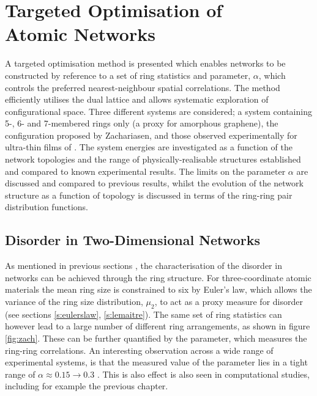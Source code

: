 \chapter[Targeted Optimisation of Atomic Networks]{Targeted Optimisation of \\ Atomic Networks}
\label{ch:targetedopt}

\begin{chapterabstract}
A targeted optimisation method is presented which enables \td{} networks to be constructed by reference to a set of ring statistics and \aw{} parameter, $\alpha$, which controls the preferred nearest\--neighbour spatial correlations.
The method efficiently utilises the dual lattice and allows systematic exploration of configurational space. 
Three different systems are considered; a system containing 5\--, 6\-- and 7\--membered rings only (a proxy for amorphous graphene), the configuration proposed by Zachariasen, and those
observed experimentally for ultra\--thin films of \sioii. 
The system energies are investigated as a function of the network topologies and the range of physically\--realisable structures established and compared to known experimental results.
The limits on the parameter $\alpha$ are discussed and compared to previous results, whilst the evolution of the network structure as a function of topology is discussed in terms of the ring\--ring pair distribution functions.
\end{chapterabstract}


\section{Disorder in Two\--Dimensional Networks}

As mentioned in previous sections , the characterisation of the disorder in \td{} networks can be achieved through the ring structure. 
For three\--coordinate atomic materials the mean ring size is constrained to six by Euler's law, which allows the variance of the ring size distribution, $\mu_2$, to act as a proxy measure for disorder (see sections \ref{s:eulerslaw}, \ref{s:lemaitre}).
The same set of ring statistics can however lead to a large number of different ring arrangements, as shown in figure \ref{fig:zach}.
These can be further quantified by the \aw{} parameter, which measures the ring\--ring correlations.
An interesting observation across a wide range of experimental systems, is that the measured value of the \aw{} parameter lies in a tight range of $\alpha\approx0.15\rightarrow 0.3$ \cite{Zsoldos1999}.
This is also effect is also seen in computational studies, including for example the previous chapter.

